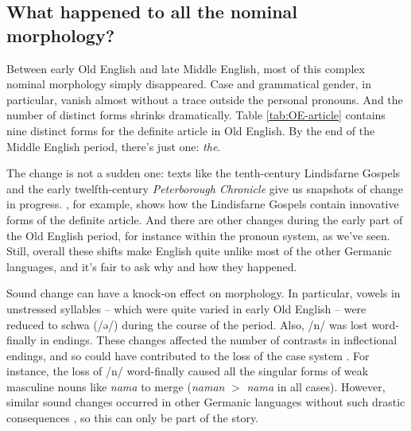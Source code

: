 \subsection{What happened to all the nominal morphology?}\label{OE-case-loss}

Between early Old English and late Middle English, most of this complex nominal morphology simply disappeared. Case and grammatical gender, in particular, vanish almost without a trace outside the personal pronouns. And the number of distinct forms shrinks dramatically. Table \ref{tab:OE-article} contains nine distinct forms for the definite article in Old English. By the end of the Middle English period, there's just one: \emph{the}.

The change is not a sudden one: texts like the tenth-century Lindisfarne Gospels and the early twelfth-century \textit{Peterborough Chronicle} give us snapshots of change in progress. \citet{Millar2000}, for example, shows how the Lindisfarne Gospels contain innovative forms of the definite article. And there are other changes during the early part of the Old English period, for instance within the pronoun system, as we've seen. Still, overall these shifts make English quite unlike most of the other Germanic languages, and it's fair to ask why and how they happened.

Sound change can have a knock-on effect on morphology. In particular, vowels in unstressed syllables -- which were quite varied in early Old English -- were reduced to schwa (/ə/) during the course of the period. Also, /n/ was lost word-finally in  endings. These changes affected the number of contrasts in inflectional endings, and so could have contributed to the loss of the case system \citep[176--180]{Blake2001}. For instance, the loss of /n/ word-finally caused all the singular forms of weak masculine nouns like \emph{nama} to merge (\emph{naman} $>$ \emph{nama} in all cases). However, similar sound changes occurred in other Germanic languages without such drastic consequences \citep{Barddal2009}, so this can only be part of the story.

